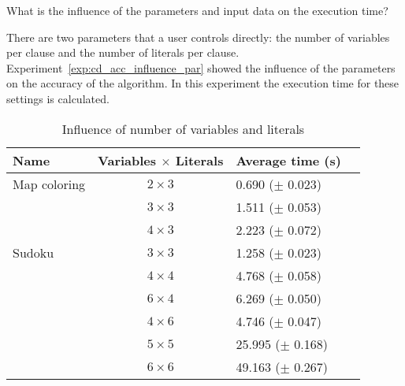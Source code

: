 \begin{question}
	What is the influence of the parameters and input data on the execution time?
\end{question}

\begin{experiment}
	There are two parameters that a user controls directly: the number of variables per clause and the number of literals per clause.
	Experiment~\ref{exp:cd_acc_influence_par} showed the influence of the parameters on the accuracy of the algorithm.
	In this experiment the execution time for these settings is calculated.

	\begin{table}[!htp]
		\begin{tabularx}{\textwidth}{lc|XX}
			\textbf{Name}	& \textbf{Variables $\times$ Literals}	& \textbf{Average time (s)} \\
			\toprule
			Map coloring 	& $2 \times 3$ 			& 0.690				($\pm$ 0.023)	\\
							& $3 \times 3$ 			& 1.511				($\pm$ 0.053)	\\
							& $4 \times 3$ 			& 2.223				($\pm$ 0.072)	\\
			\midrule	
			Sudoku 			& $3 \times 3$ 			& 1.258				($\pm$ 0.023)	\\
							& $4 \times 4$ 			& 4.768				($\pm$ 0.058)	\\
							& $6 \times 4$ 			& 6.269				($\pm$ 0.050)	\\
							& $4 \times 6$ 			& 4.746				($\pm$ 0.047)	\\
							& $5 \times 5$ 			& 25.995			($\pm$ 0.168)	\\
							& $6 \times 6$ 			& 49.163			($\pm$ 0.267)
		\end{tabularx}
		\caption{Influence of number of variables and literals}
		\label{tbl:cd_speed_influence}
	\end{table}

\end{experiment}

